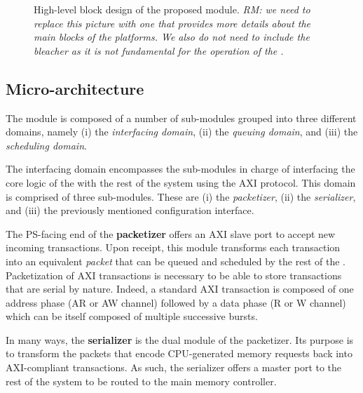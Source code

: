 \begin{figure}
  \centering
  
  \caption{High-level block design of the proposed \schim
    module. \emph{RM: we need to replace this picture with one that
      provides more details about the main blocks of the platforms. We
      also do not need to include the bleacher as it is not
      fundamental for the operation of the \schim.}}
  \label{fig:SchIM_overview_schema}
\end{figure}



\subsection{Micro-architecture}
\label{subsec:micro-arch}

The \schim module is composed of a number of sub-modules grouped into
three different domains, namely (i) the \emph{interfacing domain},
(ii) the \emph{queuing domain}, and (iii) the \emph{scheduling
  domain}.

The interfacing domain encompasses the sub-modules in charge of
interfacing the core logic of the \schim with the rest of the system
using the AXI protocol.  This domain is comprised of three
sub-modules. These are (i) the \emph{packetizer}, (ii) the
\emph{serializer}, and (iii) the previously mentioned configuration
interface.

The PS-facing end of the {\bf packetizer} offers an AXI slave port to
accept new incoming transactions. Upon receipt, this module transforms
each transaction into an equivalent \emph{packet} that can be queued
and scheduled by the rest of the \schim. Packetization of AXI
transactions is necessary to be able to store transactions that are
serial by nature.  Indeed, a standard AXI transaction is composed of
one address phase (AR or AW channel) followed by a data phase (R or W
channel) which can be itself composed of multiple successive bursts.

In many ways, the {\bf serializer} is the dual module of the
packetizer. Its purpose is to transform the packets that encode
CPU-generated memory requests back into AXI-compliant transactions. As
such, the serializer offers a master port to the rest of the system to
be routed to the main memory controller.


